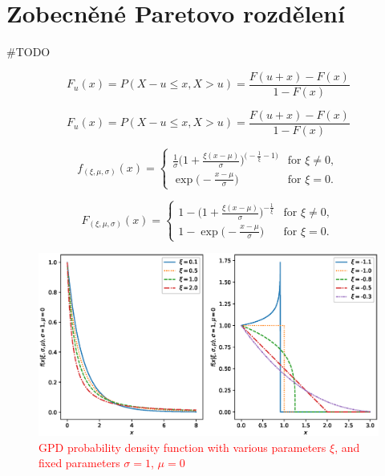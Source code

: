 \chapter{Zobecněné Paretovo rozdělení}\label{chap:gpd}
\#TODO

\begin{equation}
    F_u(x)=P(X-u \leq x,X>u)=\frac{F(u+x)-F(x)}{1-F(x)}
\end{equation}

\begin{equation}
    F_u(x)=P(X-u \leq x,X>u)=\frac{F(u+x)-F(x)}{1-F(x)}
\end{equation}


\begin{equation}
  f_{(\xi,\mu,\sigma)}(x)=\begin{cases}
    \frac{1}{\sigma}\Bigg(1+\frac{\xi(x-\mu)}{\sigma}\Bigg)^{\Big(-\frac{1}{\xi}-1\Big)} & \text{for $\xi \neq 0$},\\
    \exp \Big(-\frac{x-\mu}{\sigma}\Big) & \text{for $\xi = 0$}.
  \end{cases}
\end{equation}


\begin{equation}
  F_{(\xi,\mu,\sigma)}(x)=\begin{cases}
    1 - \Bigg(1+\frac{\xi(x-\mu)}{\sigma}\Bigg)^{-\frac{1}{\xi}} & \text{for $\xi \neq 0$},\\
    1 - \exp{\Big(-\frac{x-\mu}{\sigma} \Big)} & \text{for $\xi = 0$}.
  \end{cases}
\end{equation}

\begin{figure}
    \centering
    \includegraphics[scale=0.68]{IMG/MDPI/pdfs.eps}
    \caption{\textcolor{red}{GPD probability density function with various parameters $\xi$, and fixed parameters $\sigma=1$, $\mu=0$}}
    \label{fig:gpd_pdfs}
\end{figure}

